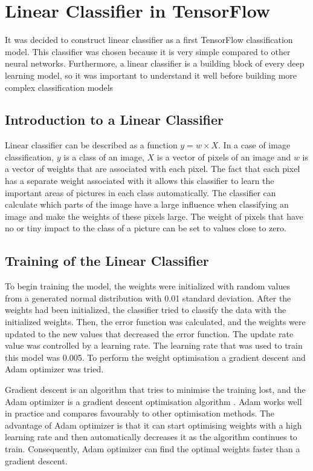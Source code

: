 \section{Linear Classifier in TensorFlow}
It was decided to construct linear classifier as a first TensorFlow classification model. This classifier was chosen because it is very simple compared to other neural networks. Furthermore, a linear classifier is a building block of every deep learning model, so it was  important to understand it well before building more complex classification models

\subsection{Introduction to a Linear Classifier}
 Linear classifier can be described as a function \(y = w\times X\). In a case of image classification, \(y\) is a class of an image, \(X\) is a vector of pixels of an image and  \(w\) is a vector of weights that are associated with each pixel. The fact that each pixel has a separate weight associated with it allows this classifier to learn the important areas of pictures in each class automatically. The classifier can calculate which parts of the image have a large influence when classifying an image and make the weights of these pixels large. The weight of pixels that have no or tiny impact to the class of a picture can be set to values close to zero.

\subsection{Training  of  the Linear Classifier}
To begin training the model, the weights were initialized with random values from a generated normal distribution with 0.01 standard deviation. After the weights had been initialized, the classifier tried to classify the data with the initialized weights. Then, the error function was calculated, and the weights were updated to the new values that decreased the error function. The update rate value was controlled by a learning rate. The learning rate that was used to train this model was 0.005. To perform the weight optimisation a gradient descent and Adam optimizer was tried.

Gradient descent is an algorithm that tries to minimise the training lost, and  the Adam optimizer is a gradient descent optimisation algorithm \cite{adam}. Adam works well in practice and compares favourably to other optimisation methods. The advantage of Adam optimizer is that it can start optimising weights with a high learning rate and then automatically decreases it as the algorithm continues to train. Consequently, Adam optimizer can find the optimal weights faster than a gradient descent.

